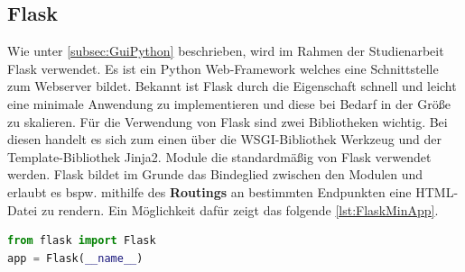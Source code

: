\documentclass[a4paper,titlepage,halfparskip,12pt]{scrreprt}
\begin{document}
\begin{onehalfspacing}
\subsection{Flask}
\label{subsec:Flask}
Wie unter \autoref{subsec:GuiPython} beschrieben, wird im Rahmen der Studienarbeit Flask verwendet. Es ist ein Python Web-Framework welches eine Schnittstelle zum Webserver bildet. Bekannt ist Flask durch die Eigenschaft schnell und leicht eine minimale Anwendung zu implementieren und diese bei Bedarf in der Größe zu skalieren. Für die Verwendung von Flask sind zwei Bibliotheken wichtig. Bei diesen handelt es sich zum einen über die \ac{WSGI}-Bibliothek Werkzeug und der Template-Bibliothek Jinja2. Module die standardmäßig von Flask verwendet werden. Flask bildet im Grunde das Bindeglied zwischen den Modulen und erlaubt es bspw. mithilfe des \textbf{Routings} an bestimmten Endpunkten eine \ac{HTML}-Datei zu rendern. Ein Möglichkeit dafür zeigt das folgende \autoref{lst:FlaskMinApp}.
\begin{lstlisting}[language=Python,caption=Example Listing of Flask Python,label={lst:FlaskMinApp}]
from flask import Flask
app = Flask(__name__)


\end{lstlisting}
\end{onehalfspacing}
\end{document}
